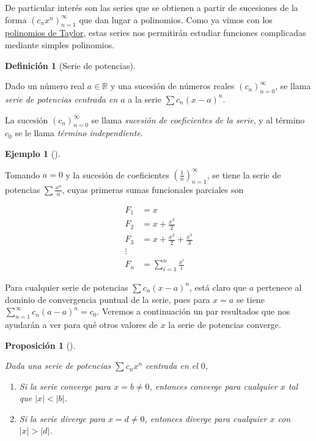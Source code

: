 \documentclass[
  a4paper,
]{scrreport}
\providecommand{\tightlist}{%
  \setlength{\itemsep}{0pt}\setlength{\parskip}{0pt}}\usepackage{longtable,booktabs,array}
\theoremstyle{plain}
\theoremstyle{plain}
\theoremstyle{definition}
\newtheorem{definition}{Definición}[chapter]
\theoremstyle{plain}
\newtheorem{proposition}{Proposición}[chapter]
\theoremstyle{definition}
\newtheorem{example}{Ejemplo}[chapter]
\theoremstyle{remark}
\begin{document}
De particular interés son las series que se obtienen a partir de
sucesiones de la forma \((c_nx^n)_{n=1}^\infty\) que dan lugar a
polinomios. Como ya vimos con los
\protect\hyperlink{polinomios-de-taylor}{polinomios de Taylor}, estas
series nos permitirán estudiar funciones complicadas mediante simples
polinomios.

\leavevmode{}%
\begin{definition}[Serie de potencias]\label{def-serie-potencias}

Dado un número real \(a\in\mathbb{R}\) y una sucesión de números reales
\((c_n)_{n=0}^\infty\), se llama \emph{serie de potencias centrada en
\(a\)} a la serie \(\sum c_n(x-a)^n\).

La sucesión \((c_n)_{n=0}^\infty\) se llama \emph{sucesión de
coeficientes de la serie}, y al término \(c_0\) se le llama
\emph{término independiente}.

\end{definition}

\leavevmode{}%
\begin{example}[]\label{exm-serie-potencias}

Tomando \(a=0\) y la sucesión de coeficientes
\(\left(\frac{1}{n}\right)_{n=1}^\infty\), se tiene la serie de
potencias \(\sum \frac{x^n}{n}\), cuyas primeras sumas funcionales
parciales son

\begin{align*}
F_1 &= x\\ 
F_2 &= x+\frac{x^2}{2}\\ 
F_3 &= x+\frac{x^2}{2}+\frac{x^3}{3}\\ 
\vdots\\ 
F_n &= \sum_{i=1}^n \frac{x^i}{i}
\end{align*}

\end{example}

Para cualquier serie de potencias \(\sum c_n(x-a)^n\), está claro que
\(a\) pertenece al dominio de convergencia puntual de la serie, pues
para \(x=a\) se tiene \(\sum_{n=1}^\infty c_n(a-a)^n = c_0\). Veremos a
continuación un par resultados que nos ayudarán a ver para qué otros
valores de \(x\) la serie de potencias converge.

\leavevmode{}%
\begin{proposition}[]\label{prp-intervalo-convergencia-serie-potencias}

Dada una serie de potencias \(\sum c_nx^n\) centrada en el \(0\),

\begin{enumerate}
\def\labelenumi{\alph{enumi}.}
\tightlist
\item
  Si la serie converge para \(x=b\neq 0\), entonces converge para
  cualquier \(x\) tal que \(|x|<|b|\).
\item
  Si la serie diverge para \(x=d\neq 0\), entonces diverge para
  cualquier \(x\) con \(|x|>|d|\).
\end{enumerate}

\end{proposition}
\end{document}
